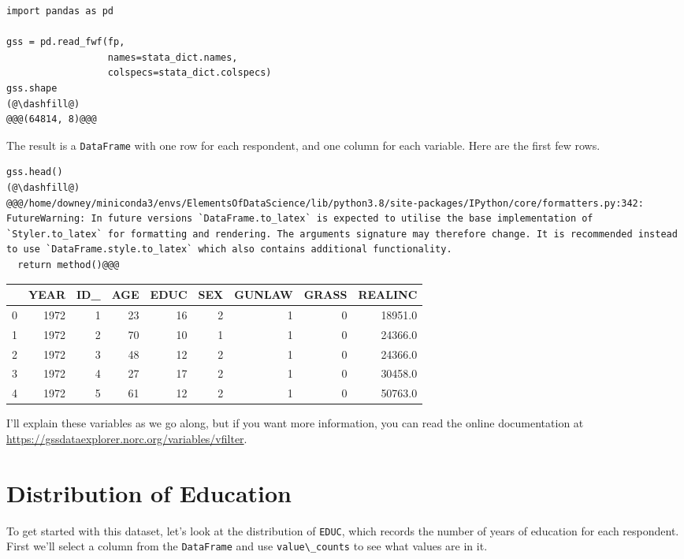 \begin{lstlisting}[]
import pandas as pd

gss = pd.read_fwf(fp, 
                  names=stata_dict.names, 
                  colspecs=stata_dict.colspecs)
gss.shape
(@\dashfill@)
@@@(64814, 8)@@@
\end{lstlisting}

The result is a \passthrough{\lstinline!DataFrame!} with one row for
each respondent, and one column for each variable. Here are the first
few rows.

\begin{lstlisting}[]
gss.head()
(@\dashfill@)
@@@/home/downey/miniconda3/envs/ElementsOfDataScience/lib/python3.8/site-packages/IPython/core/formatters.py:342: FutureWarning: In future versions `DataFrame.to_latex` is expected to utilise the base implementation of `Styler.to_latex` for formatting and rendering. The arguments signature may therefore change. It is recommended instead to use `DataFrame.style.to_latex` which also contains additional functionality.
  return method()@@@
\end{lstlisting}

\begin{tabular}{lrrrrrrrr}
\midrule
{} &  YEAR &  ID\_ &  AGE &  EDUC &  SEX &  GUNLAW &  GRASS &  REALINC \\
\midrule
0 &  1972 &    1 &   23 &    16 &    2 &       1 &      0 &  18951.0 \\
1 &  1972 &    2 &   70 &    10 &    1 &       1 &      0 &  24366.0 \\
2 &  1972 &    3 &   48 &    12 &    2 &       1 &      0 &  24366.0 \\
3 &  1972 &    4 &   27 &    17 &    2 &       1 &      0 &  30458.0 \\
4 &  1972 &    5 &   61 &    12 &    2 &       1 &      0 &  50763.0 \\
\midrule
\end{tabular}

I'll explain these variables as we go along, but if you want more
information, you can read the online documentation at
\url{https://gssdataexplorer.norc.org/variables/vfilter}.

\hypertarget{distribution-of-education}{%
\section{Distribution of Education}\label{distribution-of-education}}

To get started with this dataset, let's look at the distribution of
\passthrough{\lstinline!EDUC!}, which records the number of years of
education for each respondent. First we'll select a column from the
\passthrough{\lstinline!DataFrame!} and use
\passthrough{\lstinline!value\_counts!} to see what values are in it.

